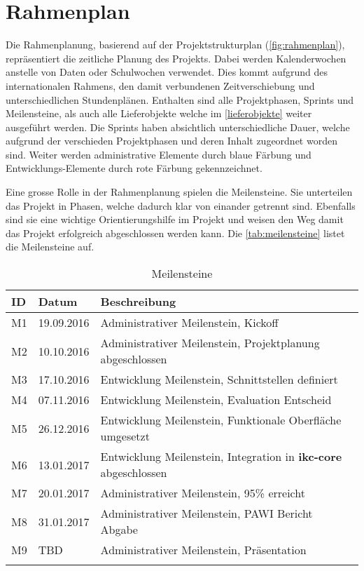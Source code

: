 \newpage

\section{Rahmenplan}
Die Rahmenplanung, basierend auf der Projektstrukturplan (\autoref{fig:rahmenplan}), repräsentiert die zeitliche Planung des Projekts. Dabei werden Kalenderwochen anstelle von Daten oder Schulwochen verwendet. Dies kommt aufgrund des internationalen Rahmens, den damit verbundenen Zeitverschiebung und unterschiedlichen Stundenplänen. Enthalten sind alle Projektphasen, Sprints und Meilensteine, als auch alle Lieferobjekte welche im \autoref{lieferobjekte} weiter ausgeführt werden. Die Sprints haben absichtlich unterschiedliche Dauer, welche aufgrund der verschieden Projektphasen und deren Inhalt zugeordnet worden sind. Weiter werden administrative Elemente durch blaue Färbung und Entwicklungs-Elemente durch rote Färbung gekennzeichnet.

Eine grosse Rolle in der Rahmenplanung spielen die Meilensteine. Sie unterteilen das Projekt in Phasen, welche dadurch klar von einander getrennt sind. Ebenfalls sind sie eine wichtige Orientierungshilfe im Projekt und weisen den Weg damit das Projekt erfolgreich abgeschlossen werden kann. Die \autoref{tab:meilensteine} listet die Meilensteine auf.


\begin{longtable}{|p{1cm}|p{2cm}|p{8.5cm}|}
  \hline
    ID & Datum &  Beschreibung \\\hline
    M1 & 19.09.2016 & Administrativer Meilenstein, Kickoff\\\hline
    M2 & 10.10.2016 & Administrativer Meilenstein, Projektplanung abgeschlossen\\\hline
    M3 & 17.10.2016 & Entwicklung Meilenstein, Schnittstellen definiert\\\hline
    M4 & 07.11.2016 & Entwicklung Meilenstein, Evaluation Entscheid\\\hline
    M5 & 26.12.2016 & Entwicklung Meilenstein, Funktionale Oberfläche umgesetzt\\\hline
    M6 & 13.01.2017 & Entwicklung Meilenstein, Integration in \textbf{ikc-core} abgeschlossen\\\hline
    M7 & 20.01.2017 & Administrativer Meilenstein, 95\% erreicht\\\hline
    M8 & 31.01.2017 & Administrativer Meilenstein, PAWI Bericht Abgabe\\\hline
    M9 & TBD & Administrativer Meilenstein, Präsentation\\\hline
    \caption{Meilensteine}
  \label{tab:meilensteine}
\end{longtable}

